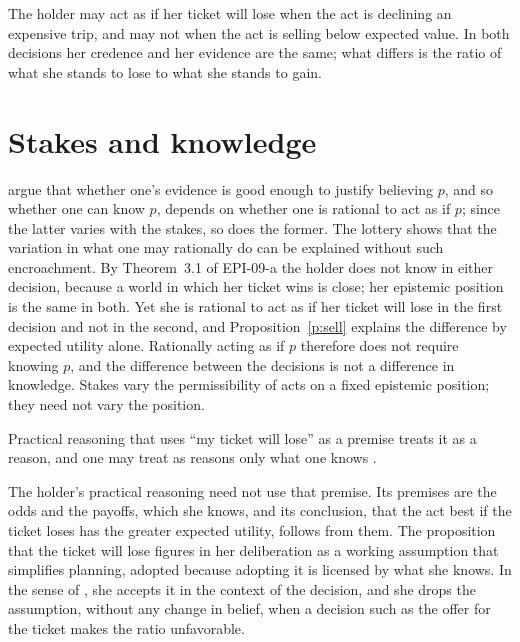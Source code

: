 \documentclass{situationist-preprint}
\begin{document}
The holder may act as if her ticket will lose when the act is declining an expensive trip, and may not when the act is selling below expected value. In both decisions her credence and her evidence are the same; what differs is the ratio of what she stands to lose to what she stands to gain.

\section{Stakes and knowledge}

\citet{FantlMcGrath2002} argue that whether one's evidence is good enough to justify believing $p$, and so whether one can know $p$, depends on whether one is rational to act as if $p$; since the latter varies with the stakes, so does the former. The lottery shows that the variation in what one may rationally do can be explained without such encroachment. By Theorem~3.1 of EPI-09-a the holder does not know in either decision, because a world in which her ticket wins is close; her epistemic position is the same in both. Yet she is rational to act as if her ticket will lose in the first decision and not in the second, and Proposition~\ref{p:sell} explains the difference by expected utility alone. Rationally acting as if $p$ therefore does not require knowing $p$, and the difference between the decisions is not a difference in knowledge. Stakes vary the permissibility of acts on a fixed epistemic position; they need not vary the position.

\begin{objection}
Practical reasoning that uses \enquote{my ticket will lose} as a premise treats it as a reason, and one may treat as reasons only what one knows \citep{HawthorneStanley2008}.
\end{objection}

\begin{reply}
The holder's practical reasoning need not use that premise. Its premises are the odds and the payoffs, which she knows, and its conclusion, that the act best if the ticket loses has the greater expected utility, follows from them. The proposition that the ticket will lose figures in her deliberation as a working assumption that simplifies planning, adopted because adopting it is licensed by what she knows. In the sense of \citet{Bratman1992}, she accepts it in the context of the decision, and she drops the assumption, without any change in belief, when a decision such as the offer for the ticket makes the ratio unfavorable.
\end{reply}
\end{document}
